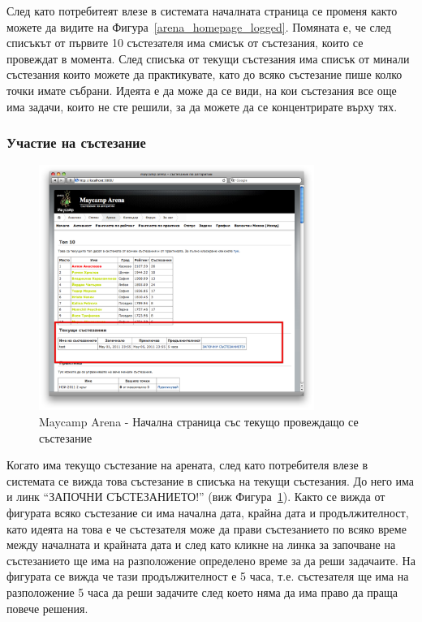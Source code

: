 \documentclass[a4paper,12pt]{article}
\begin{document}
  След като потребитеят влезе в системата началната страница се променя както можете да видите на Фигура~\ref{arena_homepage_logged}. Помяната е, че след списъкът от първите 10 състезателя има смисък от състезания, които се провеждат в момента. След списъка от текущи състезания има списък от минали състезания които можете да практикувате, като до всяко състезание пише колко точки имате събрани. Идеята е да може да се види, на кои състезания все още има задачи, които не сте решили, за да можете да се концентрирате върху тях.
  
  \pagebreak

  \subsubsection{Участие на състезание}
  
  \begin{figure}[ht]
    \begin{center}
      \includegraphics[width=0.8\textwidth]{images/maycamp_arena_home_contest.png}
    \end{center}
    \caption{Maycamp Arena - Начална страница със текущо провеждащо се състезание}
    \label{arena_homepage_contest}
  \end{figure}
  
  Когато има текущо състезание на арената, след като потребителя влезе в системата се вижда това състезание в списъка на текущи състезания. До него има и линк ``ЗАПОЧНИ СЪСТЕЗАНИЕТО!'' (виж Фигура~\ref{arena_homepage_contest}). Както се вижда от фигурата всяко състезание си има начална дата, крайна дата и продължителност, като идеята на това е че състезателя може да прави състезанието по всяко време между началната и крайната дата и след като кликне на линка за започване на състезанието ще има на разположение определено време за да реши задачаите. На фигурата се вижда че тази продължителност е 5 часа, т.е. състезателя ще има на разположение 5 часа да реши задачите след което няма да има право да праща повече решения.
  
\end{document}
